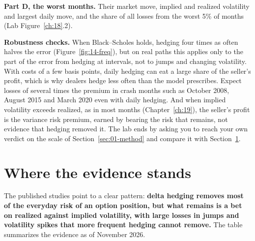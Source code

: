 \textbf{Part D, the worst months.} Their market move, implied and realized volatility and largest daily move, and the share of all losses from the worst 5\% of months (Lab Figure~\ref{ch:18}.2).

\label{sec:14-stress}
\textbf{Robustness checks.} When Black--Scholes holds, hedging four times as often halves the error (Figure~\ref{fig:14-freq}), but on real paths this applies only to the part of the error from hedging at intervals, not to jumps and changing volatility. With costs of a few basis points, daily hedging can eat a large share of the seller's profit, which is why dealers hedge less often than the model prescribes. Expect losses of several times the premium in crash months such as October 2008, August 2015 and March 2020 even with daily hedging. And when implied volatility exceeds realized, as in most months (Chapter~\ref{ch:19}), the seller's profit is the variance risk premium, earned by bearing the risk that remains, not evidence that hedging removed it. The lab ends by asking you to reach your own verdict on the scale of Section~\ref{sec:01-method} and compare it with Section~\ref{sec:14-verdict}.

\section{Where the evidence stands}
\label{sec:14-verdict}

The published studies point to a clear pattern: \textbf{delta hedging removes most of the everyday risk of an option position, but what remains is a bet on realized against implied volatility, with large losses in jumps and volatility spikes that more frequent hedging cannot remove.} The table summarizes the evidence as of November 2026.

